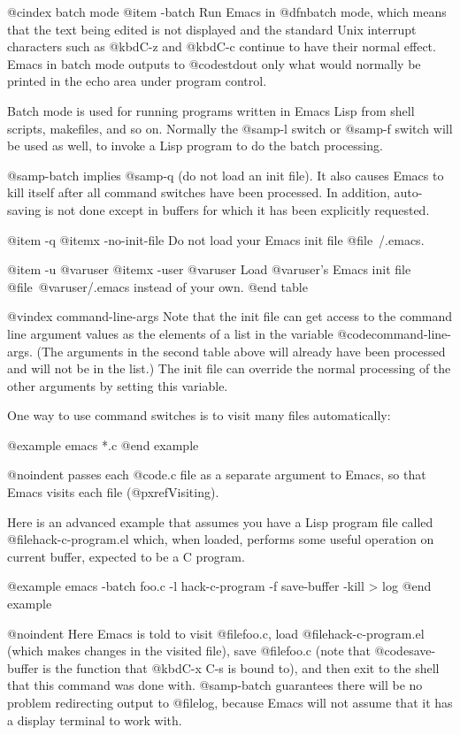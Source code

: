 {{{@cindex batch mode
@item -batch
Run Emacs in @dfn{batch mode}, which means that the text being edited is
not displayed and the standard Unix interrupt characters such as @kbd{C-z}
and @kbd{C-c} continue to have their normal effect.  Emacs in batch mode
outputs to @code{stdout} only what would normally be printed in the echo
area under program control.

Batch mode is used for running programs written in Emacs Lisp from
shell scripts, makefiles, and so on.  Normally the @samp{-l} switch
or @samp{-f} switch will be used as well, to invoke a Lisp program
to do the batch processing.

@samp{-batch} implies @samp{-q} (do not load an init file).  It also causes
Emacs to kill itself after all command switches have been processed.  In
addition, auto-saving is not done except in buffers for which it has been
explicitly requested.

@item -q
@itemx -no-init-file
Do not load your Emacs init file @file{~/.emacs}.

@item -u @var{user}
@itemx -user @var{user}
Load @var{user}'s Emacs init file @file{~@var{user}/.emacs} instead of
your own.
@end table

@vindex command-line-args
  Note that the init file can get access to the command line argument
values as the elements of a list in the variable @code{command-line-args}.
(The arguments in the second table above will already have been processed
and will not be in the list.)  The init file can override the normal
processing of the other arguments by setting this variable.

  One way to use command switches is to visit many files automatically:

@example
emacs *.c
@end example

@noindent
passes each @code{.c} file as a separate argument to Emacs, so that Emacs
visits each file (@pxref{Visiting}).

  Here is an advanced example that assumes you have a Lisp program
file called @file{hack-c-program.el} which, when loaded, performs some
useful operation on current buffer, expected to be a C program.

@example
emacs -batch foo.c -l hack-c-program -f save-buffer -kill > log
@end example

@noindent
Here Emacs is told to visit @file{foo.c}, load @file{hack-c-program.el}
(which makes changes in the visited file), save @file{foo.c} (note that
@code{save-buffer} is the function that @kbd{C-x C-s} is bound to), and
then exit to the shell that this command was done with.  @samp{-batch}
guarantees there will be no problem redirecting output to @file{log},
because Emacs will not assume that it has a display terminal to work with.

}}}
